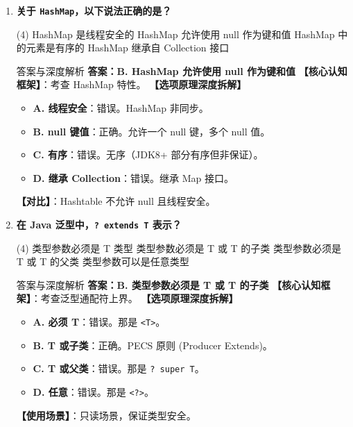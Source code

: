 \documentclass[12pt, a4paper]{ctexart}
\newcommand{\code}[1]{\texttt{#1}}
\begin{document}
\begin{enumerate}[label=\textbf{\arabic*.}, itemsep=1em]
    \item \textbf{关于 \code{HashMap}，以下说法正确的是？}
    \begin{tasks}(4)
        \task HashMap 是线程安全的 \task HashMap 允许使用 null 作为键和值
        \task HashMap 中的元素是有序的 \task HashMap 继承自 Collection 接口
    \end{tasks}
    \begin{bluebox}{答案与深度解析}
    \textbf{答案：B. HashMap 允许使用 null 作为键和值}
    \textbf{【核心认知框架】}：考查 HashMap 特性。
    \textbf{【选项原理深度拆解】}
    \begin{itemize}[leftmargin=*, nosep]
        \item \textbf{A. 线程安全}：错误。HashMap 非同步。
        \item \textbf{B. null 键值}：正确。允许一个 null 键，多个 null 值。
        \item \textbf{C. 有序}：错误。无序（JDK8+ 部分有序但非保证）。
        \item \textbf{D. 继承 Collection}：错误。继承 Map 接口。
    \end{itemize}
    \textbf{【对比】}：Hashtable 不允许 null 且线程安全。
    \end{bluebox}

    \item \textbf{在 Java 泛型中，\code{? extends T} 表示？}
    \begin{tasks}(4)
        \task 类型参数必须是 T 类型 \task 类型参数必须是 T 或 T 的子类
        \task 类型参数必须是 T 或 T 的父类 \task 类型参数可以是任意类型
    \end{tasks}
    \begin{bluebox}{答案与深度解析}
    \textbf{答案：B. 类型参数必须是 T 或 T 的子类}
    \textbf{【核心认知框架】}：考查泛型通配符上界。
    \textbf{【选项原理深度拆解】}
    \begin{itemize}[leftmargin=*, nosep]
        \item \textbf{A. 必须 T}：错误。那是 \code{<T>}。
        \item \textbf{B. T 或子类}：正确。PECS 原则 (Producer Extends)。
        \item \textbf{C. T 或父类}：错误。那是 \code{? super T}。
        \item \textbf{D. 任意}：错误。那是 \code{<?>}。
    \end{itemize}
    \textbf{【使用场景】}：只读场景，保证类型安全。
    \end{bluebox}


\end{enumerate}
\end{document}

